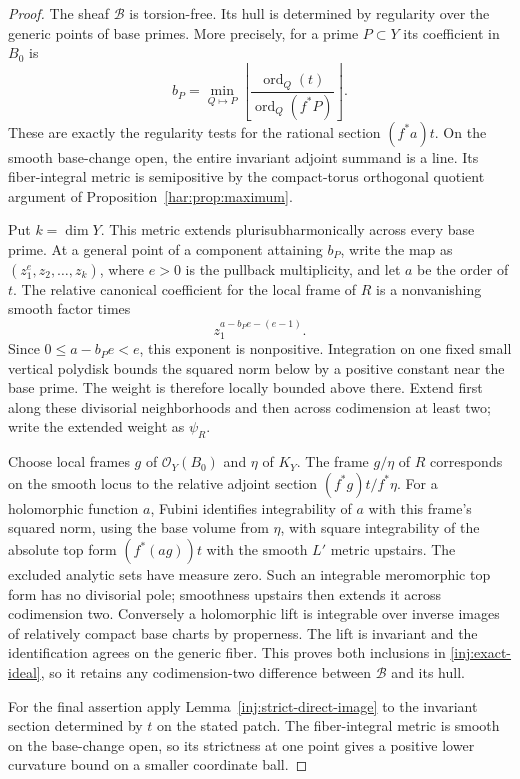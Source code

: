 \begin{proof}
The sheaf $\mathcal B$ is torsion-free. Its hull is determined by
regularity over the generic points of base primes. More precisely,
for a prime $P\subset Y$ its coefficient in $B_0$ is
\[
 b_P=\min_{Q\mapsto P}
          \left\lfloor\frac{\operatorname{ord}_Q(t)}{
          \operatorname{ord}_Q(f^*P)}\right\rfloor.
\]
These are exactly the regularity tests for the rational section
$(f^*a)t$. On the smooth base-change open, the entire invariant
adjoint summand is a line. Its fiber-integral metric is semipositive
by the compact-torus orthogonal quotient argument of
Proposition~\ref{har:prop:maximum}.

Put $k=\dim Y$. This metric extends plurisubharmonically across every base prime.
At a general point of a component attaining $b_P$, write the map
as $(z_1^e,z_2,\ldots,z_k)$, where $e>0$ is the pullback
multiplicity, and let $a$ be the order of $t$.
The relative canonical coefficient for the local frame of $R$ is
a nonvanishing smooth factor times
\[
 z_1^{a-b_Pe-(e-1)}.
\]
Since $0\le a-b_Pe<e$, this exponent is nonpositive.
Integration on one fixed small vertical polydisk bounds the squared
norm below by a positive constant near the base prime.  The weight
is therefore locally bounded above there.  Extend first along these
divisorial neighborhoods and then across codimension at least two;
write the extended weight as $\psi_R$.

Choose local frames $g$ of $\mathcal O_Y(B_0)$ and $\eta$ of $K_Y$.
The frame $g/\eta$ of $R$ corresponds on the smooth locus to the
relative adjoint section $(f^*g)t/f^*\eta$. For a holomorphic
function $a$, Fubini identifies integrability of $a$ with this frame's
squared norm, using the base volume from $\eta$, with square
integrability of the absolute top form $(f^*(ag))t$ with the smooth
$L'$ metric upstairs. The excluded analytic sets have measure
zero.  Such an integrable meromorphic top form has no divisorial
pole; smoothness upstairs then extends it across codimension two.
Conversely a holomorphic lift is integrable over inverse images of
relatively compact base charts by properness.  The lift is invariant
and the identification agrees on the generic fiber.  This proves
both inclusions in \eqref{inj:exact-ideal}, so it retains any
codimension-two difference between $\mathcal B$ and its hull.

For the final assertion apply Lemma~\ref{inj:strict-direct-image}
to the invariant section determined by $t$ on the stated patch.
The fiber-integral metric is smooth on the base-change open, so
its strictness at one point gives a positive lower curvature bound
on a smaller coordinate ball.
\end{proof}

